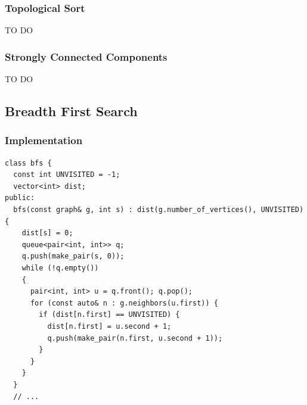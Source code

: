 \documentclass{beamer}
\begin{document}
\begin{frame}%
\frametitle{Topological Sort}

TO DO

\end{frame}

\begin{frame}%
\frametitle{Strongly Connected Components}

TO DO

\end{frame}


\subsection{Breadth First Search}


\begin{frame}[containsverbatim]
\frametitle{Implementation}
\scriptsize
\begin{lstlisting}
class bfs {
  const int UNVISITED = -1;
  vector<int> dist;
public:
  bfs(const graph& g, int s) : dist(g.number_of_vertices(), UNVISITED) {
    dist[s] = 0;
    queue<pair<int, int>> q;
    q.push(make_pair(s, 0));
    while (!q.empty())
    {
      pair<int, int> u = q.front(); q.pop();
      for (const auto& n : g.neighbors(u.first)) {
        if (dist[n.first] == UNVISITED) {
          dist[n.first] = u.second + 1;
          q.push(make_pair(n.first, u.second + 1));
        }
      }
    }
  }
  // ...
\end{lstlisting}

\end{frame}
\end{document}
